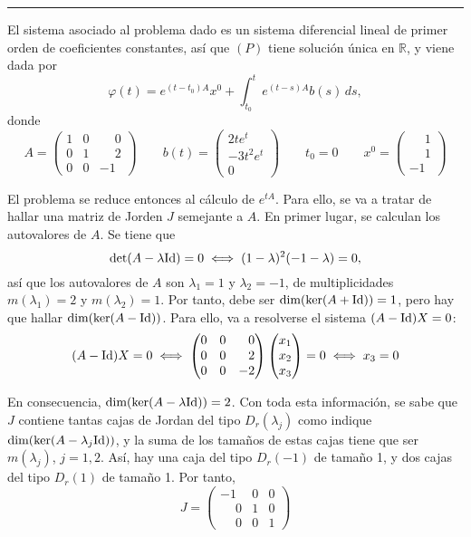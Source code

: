 \documentclass[11pt]{report}
\newcommand{\R}{\mathbb R}
\begin{document}
\vspace{2mm}

\hrule

\vspace{4mm}

El sistema asociado al problema dado es un sistema diferencial lineal de primer orden de coeficientes constantes, así que $(P)$ tiene solución única en $\R$, y viene dada por
\[\varphi(t)=e^{(t-t_0)A}x^0+\int_{t_0}^te^{(t-s)A}b(s) \, ds,\]
donde
\[A=\begin{pmatrix}
    1 & 0 & \phantom{-}0 \\
    0 & 1 & \phantom{-}2 \\
    0 & 0 & -1
\end{pmatrix} \qquad b(t)=\begin{pmatrix}
    2te^t \\
    -3t^2e^t \\
    0
\end{pmatrix} \qquad t_0=0 \qquad x^0=\begin{pmatrix}
    \phantom{-}1 \\
    \phantom{-}1 \\
    -1
\end{pmatrix}\]

El problema se reduce entonces al cálculo de $e^{tA}$. Para ello, se va a tratar de hallar una matriz de Jorden $J$ semejante a $A$. En primer lugar, se calculan los autovalores de $A$. Se tiene que
\[\textup{det}(A-\lambda \textup{Id})=0 \iff (1-\lambda)^2(-1-\lambda)=0,\]
así que los autovalores de $A$ son $\lambda_1=1$ y $\lambda_2=-1$, de multiplicidades $m(\lambda_1)=2$ y $m(\lambda_2)=1$. Por tanto, debe ser $\textup{dim}(\textup{ker}(A+\textup{Id}))=1$, pero hay que hallar $\textup{dim}(\textup{ker}(A-\textup{Id}))$. Para ello, va a resolverse el sistema $(A-\textup{Id})X=0$:
\[(A-\textup{Id})X=0 \iff \begin{pmatrix}
    0 & 0 & \phantom{-}0 \\
    0 & 0 & \phantom{-}2 \\
    0 & 0 & -2
\end{pmatrix}\begin{pmatrix}
    x_1 \\
    x_2 \\
    x_3
\end{pmatrix}=0 \iff x_3=0\]

En consecuencia, $\textup{dim}(\textup{ker}(A-\lambda\textup{Id}))=2$. Con toda esta información, se sabe que $J$ contiene tantas cajas de Jordan del tipo $D_r(\lambda_j)$ como indique $\textup{dim}(\textup{ker}(A-\lambda_j\textup{Id}))$, y la suma de los tamaños de estas cajas tiene que ser $m(\lambda_j)$, $j=1,2$. Así, hay una caja del tipo $D_r(-1)$ de tamaño 1, y dos cajas del tipo $D_r(1)$ de tamaño 1. Por tanto,
\[J=\begin{pmatrix}
    -1 & 0 & 0 \\
    \phantom{-}0 & 1 & 0 \\
    \phantom{-}0 & 0 & 1
\end{pmatrix}\]
\end{document}
